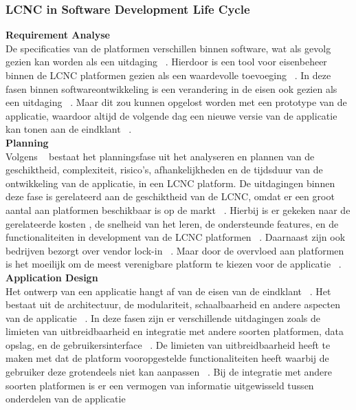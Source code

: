 \subsubsection*{LCNC in Software Development Life Cycle}
\label{subsec:lcnc-binnen-agile}
\textbf{Requirement Analyse}
\\
De specificaties van de platformen verschillen binnen software, wat als gevolg gezien kan worden als een uitdaging ~\autocite{Rokis_2022}. 
Hierdoor is een tool voor eisenbeheer binnen de LCNC platformen gezien als een waardevolle toevoeging ~\autocite{Rokis_2022}. 
In deze fasen binnen softwareontwikkeling is een verandering in de eisen ook gezien als een uitdaging ~\autocite{Rokis_2022}. 
Maar dit zou kunnen opgelost worden met een prototype van de applicatie, 
waardoor altijd de volgende dag een nieuwe versie van de applicatie kan tonen aan de eindklant ~\autocite{Rokis_2022}.
\\
\textbf{Planning}
\\
Volgens ~\textcite{Rokis_2022} bestaat het planningsfase uit het analyseren en plannen van de geschiktheid, complexiteit, risico's, afhankelijkheden en 
de tijdsduur van de ontwikkeling van de applicatie, in een LCNC platform. De uitdagingen binnen deze fase is gerelateerd aan de geschiktheid van de LCNC, 
omdat er een groot aantal aan platformen beschikbaar is op de markt ~\autocite{Rokis_2022}. Hierbij is er gekeken naar de gerelateerde kosten , de 
snelheid van het leren, de ondersteunde features, en de functionaliteiten in development van de LCNC platformen ~\autocite{Rokis_2022}. 
Daarnaast zijn ook bedrijven bezorgt over vendor lock-in ~\autocite{Rokis_2022}. Maar door de overvloed aan platformen is het moeilijk om 
de meest verenigbare platform te kiezen voor de applicatie ~\autocite{Rokis_2022}.
\\
\textbf{Application Design}
\\
Het ontwerp van een applicatie hangt af van de eisen van de eindklant ~\autocite{Rokis_2022}. 
Het bestaat uit de architectuur, de modulariteit, schaalbaarheid en andere aspecten van de applicatie ~\autocite{Rokis_2022}. 
In deze fasen zijn er verschillende uitdagingen zoals de limieten van uitbreidbaarheid en integratie met andere soorten platformen, data opslag, en de gebruikersinterface 
~\autocite{Rokis_2022}. De limieten van uitbreidbaarheid heeft te maken met dat de platform vooropgestelde functionaliteiten heeft waarbij de gebruiker deze grotendeels 
niet kan aanpassen ~\autocite{Rokis_2022}. Bij de integratie met andere soorten platformen is er een vermogen van informatie uitgewisseld tussen onderdelen van de applicatie 

